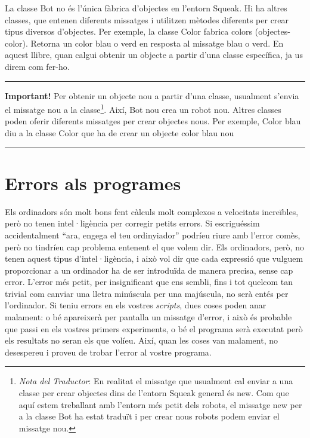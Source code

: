 La classe \textsf{Bot} no és l'única fàbrica d'objectes en l'entorn Squeak. Hi ha altres classes, que entenen diferents missatges i utilitzen mètodes diferents per crear tipus diversos d'objectes. Per exemple, la classe \textsf{Color} fabrica colors (objectes-color). Retorna un color blau o verd en resposta al missatge \textsf{blau} o \textsf{verd}. En aquest llibre, quan calgui obtenir un objecte a partir d'una classe específica, ja us direm com fer-ho.  

\newpage

\noindent
\rule{\textwidth}{2pt}
\noindent
\textbf{Important!} Per obtenir un objecte nou a partir d'una classe, usualment s'envia el missatge \textsf{nou} a la classe\footnote{\emph{Nota del Traductor}: En realitat el missatge que usualment cal enviar a una classe per crear objectes dins de l'entorn Squeak general és \textsf{new}. Com que aquí estem treballant amb l'entorn més petit dels robots, el missatge \textsf{new} per a la classe \textsf{Bot} ha estat traduït i per crear nous robots podem enviar el missatge \textsf{nou}.}. Així, \textsf{Bot nou} crea un robot nou. Altres classes poden oferir diferents missatges per crear objectes nous. Per exemple, \textsf{Color blau} diu a la classe \textsf{Color} que ha de crear un objecte color \textsf{blau} nou\\
\noindent
\rule{\textwidth}{2pt}

\section{Errors als programes}
Els ordinadors són molt bons fent càlculs molt complexos a velocitats increïbles, però no tenen intel·ligència per corregir petits errors. Si escriguéssim accidentalment ``ara, engega el teu ordinyiador'' podríeu riure amb l'error comès, però no tindríeu cap problema entenent el que volem dir. Els ordinadors, però, no tenen aquest tipus d'intel·ligència, i això vol dir que cada expressió  que vulguem proporcionar a un ordinador ha de ser introduïda de manera precisa, sense cap error. L'error més petit, per insignificant que ens sembli, fins i tot quelcom tan trivial com canviar una lletra minúscula per una majúscula, no serà entés per l'ordinador. Si teniu errors en els vostres \emph{scripts}, dues coses poden anar malament: o bé apareixerà per pantalla un missatge d'error, i això és probable que passi en els vostres primers experiments, o bé el programa serà executat però els resultats no seran els que volíeu. Així, quan les coses van malament, no desespereu i proveu de trobar l'error al vostre programa.

